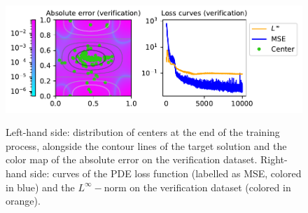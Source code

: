 \documentclass[12pt]{report} %
\begin{document}
\begin{figure}[h]
  {\includegraphics[width=\textwidth]
  {imagenes/experiments/2d/pde_fornberg_wright/TR22-C121-Tag5.pdf}}
  \caption{Left-hand side: distribution of centers at the end of the training process, alongside the contour lines of the target solution and the color map of the absolute error on the verification dataset. Right-hand side: curves of the PDE loss function (labelled as MSE, colored in blue) and the $L^\infty-$norm on the verification dataset (colored in orange).}
  \label{fig:example-analysis-TR22-C121-2d-pde}
\end{figure}
\end{document}
